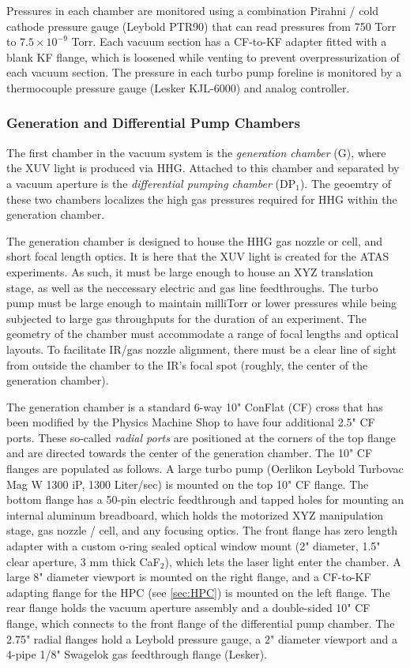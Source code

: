 Pressures in each chamber are monitored using a combination Pirahni / cold cathode pressure gauge (Leybold PTR90) that can read pressures from 750 Torr to $7.5 \times 10^{-9}$ Torr. Each vacuum section has a CF-to-KF adapter fitted with a blank KF flange, which is loosened while venting to prevent overpressurization of each vacuum section. The pressure in each turbo pump foreline is monitored by a thermocouple pressure gauge (Lesker KJL-6000) and analog controller.

\subsubsection{Generation and Differential Pump Chambers}

The first chamber in the vacuum system is the \textit{generation chamber} (G), where the XUV light is produced via HHG. Attached to this chamber and separated by a vacuum aperture is the \textit{differential pumping chamber} (DP$_1$). The geoemtry of these two chambers localizes the high gas pressures required for HHG within the generation chamber.

The generation chamber is designed to house the HHG gas nozzle or cell, and short focal length optics. It is here that the XUV light is created for the ATAS experiments. As such, it must be large enough to house an XYZ translation stage, as well as the neccessary electric and gas line feedthroughs. The turbo pump must be large enough to maintain milliTorr or lower pressures while being subjected to large gas throughputs for the duration of an experiment. The geometry of the chamber must accommodate a range of focal lengths and optical layouts. To facilitate IR/gas nozzle alignment, there must be a clear line of sight from outside the chamber to the IR's focal spot (roughly, the center of the generation chamber).

The generation chamber is a standard 6-way 10" ConFlat (CF) cross that has been modified by the Physics Machine Shop to have four additional 2.5" CF ports. These so-called \textit{radial ports} are positioned at the corners of the top flange and are directed towards the center of the generation chamber. The 10" CF flanges are populated as follows. A large turbo pump (Oerlikon Leybold Turbovac Mag W 1300 iP, 1300 Liter/sec) is mounted on the top 10" CF flange. The bottom flange has a 50-pin electric feedthrough and tapped holes for mounting an internal aluminum breadboard, which holds the motorized XYZ manipulation stage, gas nozzle / cell, and any focusing optics. The front flange has zero length adapter with a custom o-ring sealed optical window mount (2" diameter, 1.5" clear aperture, 3 mm thick CaF$_2$), which lets the laser light enter the chamber. A large 8" diameter viewport is mounted on the right flange, and a CF-to-KF adapting flange for the HPC (see \cref{sec:HPC}) is mounted on the left flange. The rear flange holds the vacuum aperture assembly and a double-sided 10" CF flange, which connects to the front flange of the differential pump chamber. The 2.75" radial flanges hold a Leybold pressure gauge, a 2" diameter viewport and a 4-pipe 1/8" Swagelok gas feedthrough flange (Lesker).

